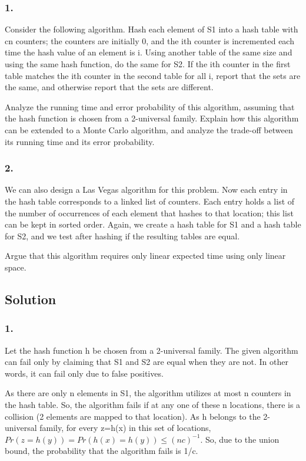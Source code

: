 \documentclass[10pt]{amsart}
\theoremstyle{remark}
\begin{document}
\subsubsection{1.} Consider the following algorithm. Hash each element of S1 into a hash table with cn counters; the counters are initially 0, and the ith counter is incremented each time the hash value of an element is i. Using another table of the same size and using the same hash function, do the same for S2. If the ith counter in the first table matches the ith counter in the second table for all i, report that the sets are the same, and otherwise report that the sets are different.

Analyze the running time and error probability of this algorithm, assuming that the hash function is chosen from a 2-universal family. Explain how this algorithm can be extended to a Monte Carlo algorithm, and analyze the trade-off between its running time and its error probability.

\subsubsection{2.} We can also design a Las Vegas algorithm for this problem. Now each entry in the hash table corresponds to a linked list of counters. Each entry holds a list of the number of occurrences of each element that hashes to that location; this list can be kept in sorted order. Again, we create a hash table for S1 and a hash table for S2, and we test after hashing if the resulting tables are equal.

Argue that this algorithm requires only linear expected time using only linear space.

\subsection{Solution}
\subsubsection{1.}

Let the hash function h be chosen from a 2-universal family. The given algorithm can fail only by claiming that S1 and S2 are equal when they are not. In other words, it can fail only due to false positives.

As there are only n elements in S1, the algorithm utilizes at most n counters in the hash table. So, the algorithm fails if at any one of these n locations, there is a collision (2 elements are mapped to that location). As h belongs to the 2-universal family, for every z=h(x) in this set of locations, $Pr(z = h(y)) = Pr(h(x) = h(y)) \leq (nc)^{-1}$. So, due to the union bound, the probability that the algorithm fails is 1/c.
\end{document}
